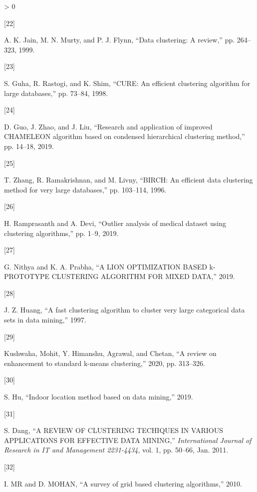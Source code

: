 \documentclass[
]{article}
\newlength{\cslhangindent}
\newlength{\csllabelwidth}
\newenvironment{CSLReferences}[3] %
 {%
  \setlength{\parindent}{0pt}
  \ifodd #1 \everypar{\setlength{\hangindent}{\cslhangindent}}\ignorespaces\fi
  \ifnum #2 > 0
  \setlength{\parskip}{#2\baselineskip}
  \fi
 }%
 {}
\newcommand{\CSLLeftMargin}[1]{\parbox[t]{\csllabelwidth}{#1}}
\newcommand{\CSLRightInline}[1]{\parbox[t]{\linewidth - \csllabelwidth}{#1}}
\begin{document}
\begin{CSLReferences}{0}{0}
\leavevmode\hypertarget{ref-b19}{}%
\CSLLeftMargin{{[}22{]} }
\CSLRightInline{A. K. Jain, M. N. Murty, and P. J. Flynn, {``Data
clustering: A review,''} pp. 264--323, 1999.}

\leavevmode\hypertarget{ref-b20}{}%
\CSLLeftMargin{{[}23{]} }
\CSLRightInline{S. Guha, R. Rastogi, and K. Shim, {``CURE: An efficient
clustering algorithm for large databases,''} pp. 73--84, 1998.}

\leavevmode\hypertarget{ref-b21}{}%
\CSLLeftMargin{{[}24{]} }
\CSLRightInline{D. Guo, J. Zhao, and J. Liu, {``Research and application
of improved CHAMELEON algorithm based on condensed hierarchical
clustering method,''} pp. 14--18, 2019.}

\leavevmode\hypertarget{ref-b22}{}%
\CSLLeftMargin{{[}25{]} }
\CSLRightInline{T. Zhang, R. Ramakrishnan, and M. Livny, {``BIRCH: An
efficient data clustering method for very large databases,''} pp.
103--114, 1996.}

\leavevmode\hypertarget{ref-b24}{}%
\CSLLeftMargin{{[}26{]} }
\CSLRightInline{H. Ramprasanth and A. Devi, {``Outlier analysis of
medical dataset using clustering algorithms,''} pp. 1--9, 2019.}

\leavevmode\hypertarget{ref-b25}{}%
\CSLLeftMargin{{[}27{]} }
\CSLRightInline{G. Nithya and K. A. Prabha, {``A LION OPTIMIZATION BASED
k-PROTOTYPE CLUSTERING ALGORITHM FOR MIXED DATA,''} 2019.}

\leavevmode\hypertarget{ref-b26}{}%
\CSLLeftMargin{{[}28{]} }
\CSLRightInline{J. Z. Huang, {``A fast clustering algorithm to cluster
very large categorical data sets in data mining,''} 1997.}

\leavevmode\hypertarget{ref-b27}{}%
\CSLLeftMargin{{[}29{]} }
\CSLRightInline{Kushwaha, Mohit, Y. Himanshu, Agrawal, and Chetan, {``A
review on enhancement to standard k-means clustering,''} 2020, pp.
313--326.}

\leavevmode\hypertarget{ref-b28}{}%
\CSLLeftMargin{{[}30{]} }
\CSLRightInline{S. Hu, {``Indoor location method based on data
mining,''} 2019.}

\leavevmode\hypertarget{ref-b30}{}%
\CSLLeftMargin{{[}31{]} }
\CSLRightInline{S. Dang, {``A REVIEW OF CLUSTERING TECHIQUES IN VARIOUS
APPLICATIONS FOR EFFECTIVE DATA MINING,''} \emph{International Journal
of Research in IT and Management 2231-4434}, vol. 1, pp. 50--66, Jan.
2011.}

\leavevmode\hypertarget{ref-b31}{}%
\CSLLeftMargin{{[}32{]} }
\CSLRightInline{I. MR and D. MOHAN, {``A survey of grid based clustering
algorithms,''} 2010.}


\end{CSLReferences}
\end{document}
